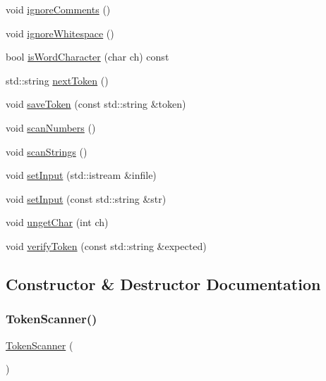 \begin{DoxyCompactItemize}
void \mbox{\hyperlink{classTokenScanner_a2948758a40dec8f13f9de47352afcc9f}{ignore\+Comments}} ()
\item 
void \mbox{\hyperlink{classTokenScanner_a1dd9d28ae227b7e0313be6dd0ecca373}{ignore\+Whitespace}} ()
\item 
bool \mbox{\hyperlink{classTokenScanner_ad3446183cc2011a6bb3ebe1ce1c3391a}{is\+Word\+Character}} (char ch) const
\item 
std\+::string \mbox{\hyperlink{classTokenScanner_ad515fb115cc77b70c2a498049ba16256}{next\+Token}} ()
\item 
void \mbox{\hyperlink{classTokenScanner_a6ca063c69febcb61e6b49a210563194f}{save\+Token}} (const std\+::string \&token)
\item 
void \mbox{\hyperlink{classTokenScanner_a0bebe5cb8dd72954dc34cf5338db03dc}{scan\+Numbers}} ()
\item 
void \mbox{\hyperlink{classTokenScanner_af85e801b4ef298db6ddbfd539a8f45db}{scan\+Strings}} ()
\item 
void \mbox{\hyperlink{classTokenScanner_adb06e967f852573750bd97c5a76c790c}{set\+Input}} (std\+::istream \&infile)
\item 
void \mbox{\hyperlink{classTokenScanner_a3c337c514c15a062c8e3dd04e0e9a824}{set\+Input}} (const std\+::string \&str)
\item 
void \mbox{\hyperlink{classTokenScanner_a44b49340cfed6b94e9f625c9f2f73fbf}{unget\+Char}} (int ch)
\item 
void \mbox{\hyperlink{classTokenScanner_ad7ae526d42faff3aca1c860f302cbb76}{verify\+Token}} (const std\+::string \&expected)
\end{DoxyCompactItemize}


\subsection{Constructor \& Destructor Documentation}
\mbox{\label{classTokenScanner_a284595cf3c3df7d3e70ef2dcdc1f0292}} 
\subsubsection{\texorpdfstring{Token\+Scanner()}{TokenScanner()}\hspace{0.1cm}{\footnotesize\ttfamily [1/3]}}
{\footnotesize\ttfamily \mbox{\hyperlink{classTokenScanner}{Token\+Scanner}} (\begin{DoxyParamCaption}{ }\end{DoxyParamCaption})}

